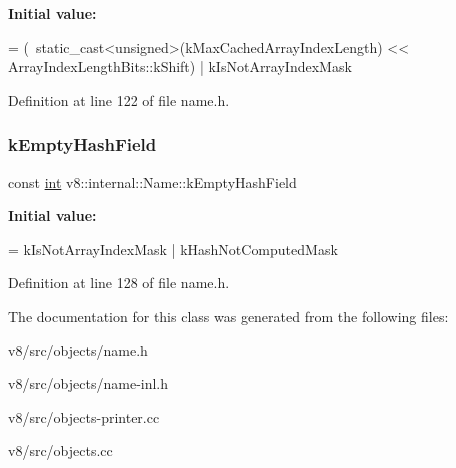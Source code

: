 {\bfseries Initial value\+:}
\begin{DoxyCode}
=
      (~static\_cast<\textcolor{keywordtype}{unsigned}>(kMaxCachedArrayIndexLength)
       << ArrayIndexLengthBits::kShift) |
      kIsNotArrayIndexMask
\end{DoxyCode}


Definition at line 122 of file name.\+h.

\mbox{\label{classv8_1_1internal_1_1Name_a2a35367ed3cb3999a8e6d3d46680b816}} 
\subsubsection{\texorpdfstring{k\+Empty\+Hash\+Field}{kEmptyHashField}}
{\footnotesize\ttfamily const \mbox{\hyperlink{classint}{int}} v8\+::internal\+::\+Name\+::k\+Empty\+Hash\+Field\hspace{0.3cm}{\ttfamily [static]}}

{\bfseries Initial value\+:}
\begin{DoxyCode}
=
      kIsNotArrayIndexMask | kHashNotComputedMask
\end{DoxyCode}


Definition at line 128 of file name.\+h.



The documentation for this class was generated from the following files\+:\begin{DoxyCompactItemize}
\item 
v8/src/objects/name.\+h\item 
v8/src/objects/name-\/inl.\+h\item 
v8/src/objects-\/printer.\+cc\item 
v8/src/objects.\+cc\end{DoxyCompactItemize}
